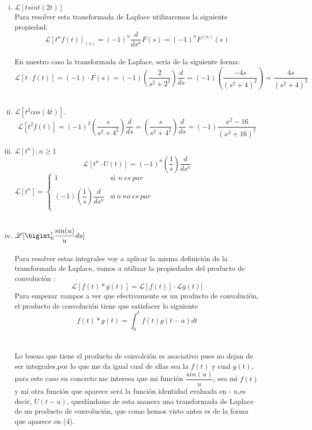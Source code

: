 \documentclass[11pt]{article}
\def\Laplace#1{\mathscr{L}}%
\begin{document}
\begin{enumerate}[(i)]
\item $\Laplace[[tsint(2t)]$
\\ Para resolver esta transformada de Laplace utilizaremos la siguiente propiedad:\\
\begin{equation}
\Laplace[[t^nf(t)]_{(s)}=(-1)^n\dfrac{d}{ds^n}F(s)=(-1)^nF^{(n)}(s)
\end{equation}
\\ En nuestro caso la transformada de Laplace, sería de la siguiente forma:
$$\Laplace[[t\cdot f(t)]=(-1)\cdot F(s)=(-1) \left(\dfrac{2}{s^2+2^2}\right)\dfrac{d}{ds}=(-1)\left(\dfrac{-4s}{(s^2+4)^2}\right)=\dfrac{4s}{(s^2+4)^2}$$
\\ \item $\Laplace[[t^2cos(4t)].$ \\
$$\Laplace[[t^2f(t)]=(-1)^2\left(\dfrac{s}{s^2+4^2}\right)\dfrac{d}{ds}=\left(\dfrac{s}{s^2+4^2}\right)\dfrac{d}{ds}=(-1)\dfrac{x^2-16}{(x^2+16)^2}$$
\clearpage
\item $\Laplace[[t^n];n\geq 1$
\\ $$\Laplace[[t^n\cdot U(t)]=(-1)^n \left(\dfrac{1}{s}\right)\dfrac{d}{ds^n}$$
$ \Laplace[[t^n] = \left\{
	       \begin{array}{ll} 
		 1      & \mathrm{si\ }  \ n \ es \ par\\ \\
		 (-1) \left(\dfrac{1}{s}\right)\dfrac{d}{ds^n} & \mathrm{si\ } 	 n \ no \ es \ par \\
		
	       \end{array}
	     \right.$ \\ \\
\item $\Laplace[[\bigint_0^{t}\dfrac{sin(u)}{u}du]$
\\ \\ Para resolver estas integrales voy a aplicar la misma definición de la transformada de Laplace, vamos a utilizar la propiedades del producto de convolución :
\begin{equation}
\Laplace[[f(t)*g(t)]=\Laplace[[f(t)]\cdot \Laplace[g(t)]
\end{equation}
Para empezar vampos a ver que efectivamente  es un producto de convolución, el producto de convolución tiene que satisfacer lo siguiente
\begin{equation}
f(t)*g(t)=\int_0^tf(t)g(t-a)dt
\end{equation}
\\ \\ Lo bueno que tiene el producto de convolción es asociativo pues no dejan de ser integrales,por lo que me da igual cual de ellas sea la $f(t)$ y cual $g(t)$, para este caso en concreto me interesa que mi función $\dfrac{sin(u)}{u}$, sea mi $f(t)$ y mi otra función que aparece será la función identidad evaluada en - u,es decir, $ U(t-u)$, quedándome de esta manera una transformada de Laplace de un producto de convolución, que como hemos visto antes es de la forma que aparece en (4).


\end{enumerate}
\end{document}
